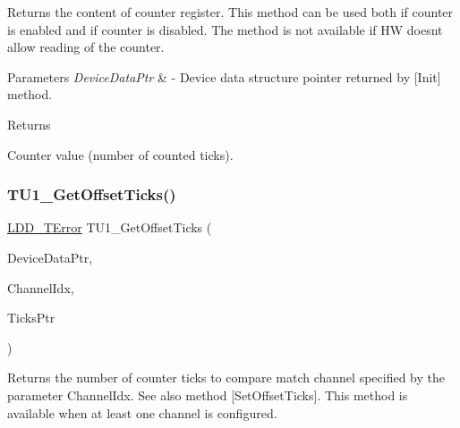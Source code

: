 Returns the content of counter register. This method can be used both if counter is enabled and if counter is disabled. The method is not available if HW doesn\textquotesingle{}t allow reading of the counter. 


\begin{DoxyParams}{Parameters}
{\em Device\+Data\+Ptr} & -\/ Device data structure pointer returned by \mbox{[}Init\mbox{]} method. \\
\hline
\end{DoxyParams}
\begin{DoxyReturn}{Returns}

\begin{DoxyItemize}
\item Counter value (number of counted ticks). 
\end{DoxyItemize}
\end{DoxyReturn}
\mbox{\label{group___t_u1__module_ga92c04b5447fde657da71680968acd784}} 
\subsubsection{\texorpdfstring{T\+U1\+\_\+\+Get\+Offset\+Ticks()}{TU1\_GetOffsetTicks()}}
{\footnotesize\ttfamily \hyperlink{group___p_e___types__module_ga24c2b045fd04e79e85f261ce4df35588}{L\+D\+D\+\_\+\+T\+Error} T\+U1\+\_\+\+Get\+Offset\+Ticks (\begin{DoxyParamCaption}\item[{\hyperlink{group___p_e___types__module_gac5cf1362f1f0e3a2ce71b1bf2276d091}{L\+D\+D\+\_\+\+T\+Device\+Data} $\ast$}]{Device\+Data\+Ptr,  }\item[{uint8\+\_\+t}]{Channel\+Idx,  }\item[{T\+U1\+\_\+\+T\+Value\+Type $\ast$}]{Ticks\+Ptr }\end{DoxyParamCaption})}



Returns the number of counter ticks to compare match channel specified by the parameter Channel\+Idx. See also method \mbox{[}Set\+Offset\+Ticks\mbox{]}. This method is available when at least one channel is configured. 


